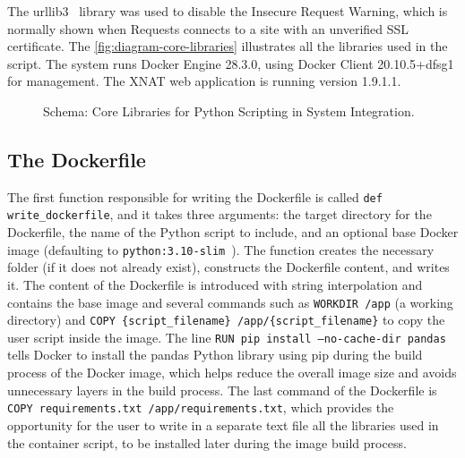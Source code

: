 The urllib3~\cite{urllib3} library was used to disable the Insecure Request Warning, which is normally shown when Requests connects to a site with an unverified SSL certificate. The \autoref{fig:diagram-core-libraries} illustrates all the libraries used in the script.
The system runs Docker Engine 28.3.0, using Docker Client 20.10.5+dfsg1 for management. The XNAT web application is running version 1.9.1.1.

\begin{figure}[H]
  \centering
  \def\svgwidth{0.4\linewidth}
  
  \caption{Schema: Core Libraries for Python Scripting in System Integration.}
  \label{fig:diagram-core-libraries}
\end{figure}
 
  \subsection{The Dockerfile}
 
The first function responsible for writing the Dockerfile is called \texttt{def write\_dockerfile}, and it takes three arguments: the target directory for the Dockerfile, the name of the Python script to include, and an optional base Docker image (defaulting to \texttt{python:3.10-slim}~\cite{Dockerbaseimage}). The function creates the necessary folder (if it does not already exist), constructs the Dockerfile content, and writes it. The content of the Dockerfile is introduced with string interpolation and contains the base image and several commands such as \texttt{WORKDIR /app} (a working directory) and \texttt{COPY \{script\_filename\} /app/\{script\_filename\}} to copy the user script inside the image. The line \texttt{RUN pip install --no-cache-dir pandas} tells Docker to install the pandas Python library using pip during the build process of the Docker image, which helps reduce the overall image size and avoids unnecessary layers in the build process. The last command of the Dockerfile is \texttt{COPY requirements.txt /app/requirements.txt}, which provides the opportunity for the user to write in a separate text file all the libraries used in the container script, to be installed later during the image build process.





